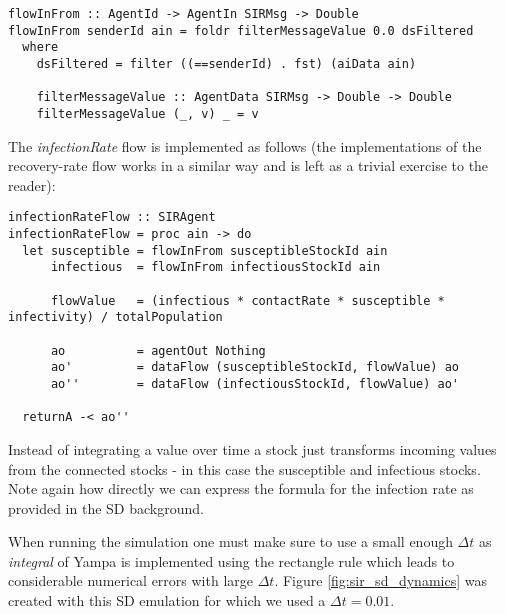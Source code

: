 \begin{verbatim}
flowInFrom :: AgentId -> AgentIn SIRMsg -> Double
flowInFrom senderId ain = foldr filterMessageValue 0.0 dsFiltered
  where 
    dsFiltered = filter ((==senderId) . fst) (aiData ain)

    filterMessageValue :: AgentData SIRMsg -> Double -> Double
    filterMessageValue (_, v) _ = v
\end{verbatim}
	
The \textit{infectionRate} flow is implemented as follows (the implementations of the recovery-rate flow works in a similar way and is left as a trivial exercise to the reader):

\begin{verbatim}
infectionRateFlow :: SIRAgent
infectionRateFlow = proc ain -> do
  let susceptible = flowInFrom susceptibleStockId ain 
      infectious  = flowInFrom infectiousStockId ain

      flowValue   = (infectious * contactRate * susceptible * infectivity) / totalPopulation
  
      ao          = agentOut Nothing
      ao'         = dataFlow (susceptibleStockId, flowValue) ao
      ao''        = dataFlow (infectiousStockId, flowValue) ao'
      
  returnA -< ao''
\end{verbatim}

Instead of integrating a value over time a stock just transforms incoming values from the connected stocks - in this case the susceptible and infectious stocks. Note again how directly we can express the formula for the infection rate as provided in the SD background.

When running the simulation one must make sure to use a small enough $\Delta t$ as \textit{integral} of Yampa is implemented using the rectangle rule which leads to considerable numerical errors with large $\Delta t$. Figure \ref{fig:sir_sd_dynamics} was created with this SD emulation for which we used a $\Delta t = 0.01$.

